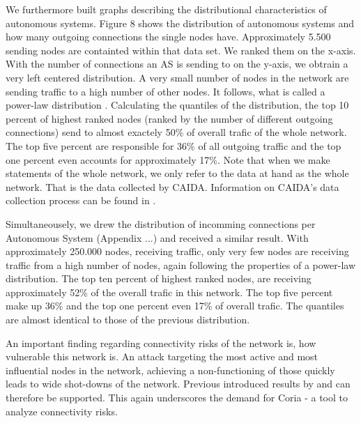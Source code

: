 \documentclass[conference, 11pt]{IEEEtran}
\begin{document}
We furthermore built graphs describing the distributional characteristics of autonomous systems. Figure 8 shows the distribution of autonomous systems and how many outgoing connections the single nodes have. Approximately 5.500 sending nodes are containted within that data set. We ranked them on the x-axis. With the number of connections an AS is sending to on the y-axis, we obtrain a very left centered distribution. A very small number of nodes in the network are sending traffic to a high number of other nodes. It follows, what is called a power-law distribution  \cite{powerlawCitation}. Calculating the quantiles of the distribution, the top 10 percent of highest ranked nodes (ranked by the number of different outgoing connections) send to almost exactely 50\% of overall trafic of the whole network. The top five percent are responsible for 36\% of all outgoing traffic and the top one percent even accounts for approximately 17\%. Note that when we make statements of the whole network, we only refer to the data at hand as the whole network. That is the data collected by CAIDA. Information on CAIDA's data collection process can be found in \cite{CaidaDataCollection} . 


Simultaneousely, we drew the distribution of incomming connections per Autonomous System (Appendix ...) and received a similar result. With approximately 250.000 nodes, receiving traffic, only very few nodes are receiving traffic from a high number of nodes, again following the properties of a power-law distribution. The top ten percent of highest ranked nodes, are receiving approximately 52\% of the overall trafic in this network. The top five percent make up 36\% and the top one percent even 17\% of overall trafic. The quantiles are almost identical to those of the previous distribution. 



 


An important finding regarding connectivity risks of the network is, how vulnerable this network is. An attack targeting the most active and most influential nodes in the network, achieving a non-functioning of those quickly leads to wide shot-downs of the network. Previous introduced results by \cite{powerlawCitation} and \cite{owningInternet} can therefore be supported.  This again underscores the demand for Coria - a tool to analyze connectivity risks. 
\end{document}
